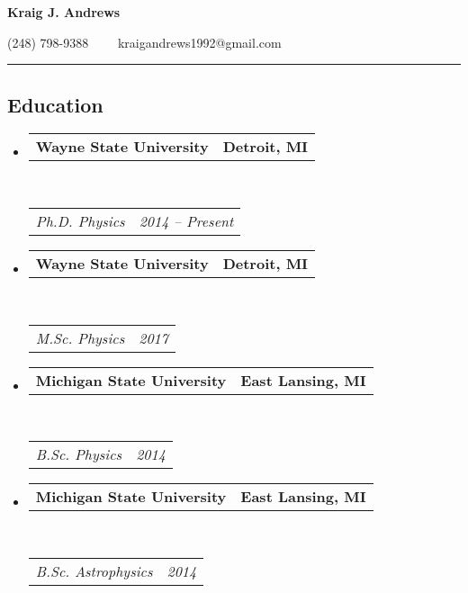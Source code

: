\documentclass[10pt,letterpaper]{article}
\makeatletter
\newcommand{\headerrow}[2]
{\begin{tabular*}{\linewidth}{l@{\extracolsep{\fill}}r}
	#1 &
	#2 \\
\end{tabular*}}
\makeatother
\begin{document}
\begin{center}
{\LARGE \textbf{Kraig J. Andrews}}

(248) 798-9388\ \ \textbullet
\ \ kraigandrews1992@gmail.com
\end{center}

\hrule
\vspace{-0.4em}
\subsection*{Education}

\begin{itemize}
	\parskip=0.1em

    \item 
    \headerrow
        {\textbf{Wayne State University}}
        {\textbf{Detroit, MI}}
    \\
    \headerrow
        {\emph{Ph.D. Physics}}
        {\emph{2014 -- Present}}
    
    \item 
    \headerrow
        {\textbf{Wayne State University}}
        {\textbf{Detroit, MI}}
    \\
    \headerrow
	{\emph{M.Sc. Physics}}
        {\emph{2017}}

	\item 
	\headerrow
	{\textbf{Michigan State University}}
	{\textbf{East Lansing, MI}}
	\\
	\headerrow
	{\emph{B.Sc. Physics}}
        {\emph{2014}}
    
    \item 
    \headerrow
        {\textbf{Michigan State University}}
        {\textbf{East Lansing, MI}}
    \\
    \headerrow
        {\emph{B.Sc. Astrophysics}}
        {\emph{2014}}

\end{itemize}
\end{document}
